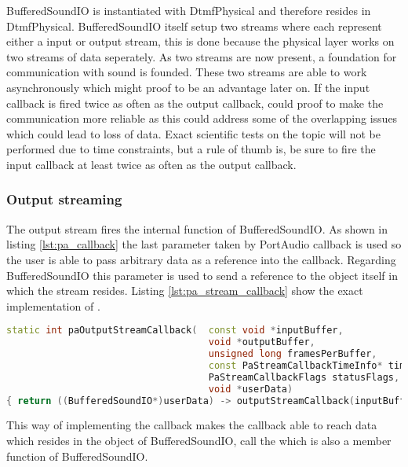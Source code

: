 	BufferedSoundIO is instantiated with DtmfPhysical and therefore resides in DtmfPhysical. BufferedSoundIO itself setup two streams where each
	represent either a input or output stream, this is done because the physical layer works on two streams of data seperately. As two streams are 
	now present, a foundation for communication with sound is founded. These two streams are able to work asynchronously which might proof to be an
	advantage later on. If the input callback is fired twice as often as the output callback, could proof to make the communication more reliable
	as this could address some of the overlapping issues which could lead to loss of data. Exact scientific tests on the topic will not be performed
	due to time constraints, but a rule of thumb is, be sure to fire the input callback at least twice as often as the output callback.
	
		\subsubsection{Output streaming}
		The output stream fires the internal  function of BufferedSoundIO. As shown in listing \ref{lst:pa_callback}
		the last parameter taken by PortAudio callback  is used so the user is able to pass arbitrary data as a reference into the
		callback. Regarding BufferedSoundIO this parameter is used to send a reference to the object itself in which the stream resides. 
		Listing \ref{lst:pa_stream_callback} show the exact implementation of .
		
		\begin{lstlisting}[float=htb,language={C++},caption={Implementation of \smalltt{paOutputStreamCallback}},label={lst:pa_stream_callback}]
static int paOutputStreamCallback(	const void *inputBuffer,
									void *outputBuffer,
									unsigned long framesPerBuffer,
									const PaStreamCallbackTimeInfo* timeInfo,
									PaStreamCallbackFlags statusFlags,
									void *userData)
{ return ((BufferedSoundIO*)userData) -> outputStreamCallback(inputBuffer, outputBuffer, framesPerBuffer, timeInfo, statusFlags); }
		\end{lstlisting}
		
		This way of implementing the callback makes the callback able to reach data which resides in the object of BufferedSoundIO,
		 call the  which is also a member function of BufferedSoundIO.
		
